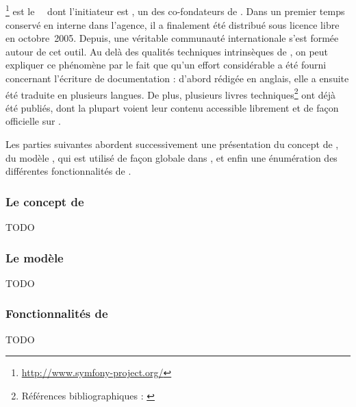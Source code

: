 \subsection{\asf}

\asf\footnote{\url{http://www.symfony-project.org/}} est le \afm\ \aphp\ dont l'initiateur est \apotencier, un des co-fondateurs de \asl. Dans un premier temps conservé en interne dans l'agence, il a finalement été distribué sous licence libre en octobre~2005. Depuis, une véritable communauté internationale s'est formée autour de cet outil. Au delà des qualités techniques intrinsèques de \asf, on peut expliquer ce phénomène par le fait que qu'un effort considérable a été fourni concernant l'écriture de documentation : d'abord rédigée en anglais, elle a ensuite été traduite en plusieurs langues. De plus, plusieurs livres techniques\footnote{Références bibliographiques : \cite{practicalsf} \cite{sfrefguide} \cite{cahierssf} \cite{moresf} \cite{thebook}} ont déjà été publiés, dont la plupart voient leur contenu accessible librement et de façon officielle sur \ainternet.

Les parties suivantes abordent successivement une présentation du concept de \afm, du modèle \amvc, qui est utilisé de façon globale dans \asf, et enfin une énumération des différentes fonctionnalités de \asf.


\subsubsection{Le concept de \afm}

TODO


\subsubsection{Le modèle \amvc}

TODO


\subsubsection{Fonctionnalités de \asf}

TODO
